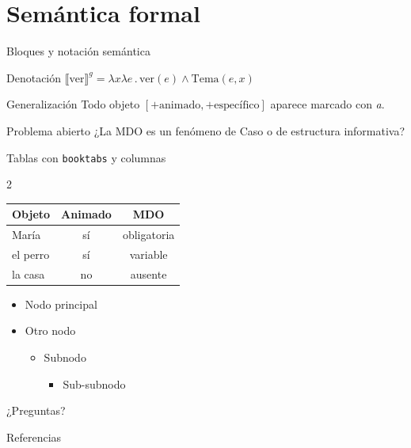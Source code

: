 \documentclass[aspectratio=169,10pt]{beamer}
\begin{document}
\section{Semántica formal}

\begin{frame}{Bloques y notación semántica}
  \begin{block}{Denotación}
    $\llbracket \text{ver} \rrbracket^{g} =
      \lambda x \lambda e\,.\,\mathrm{ver}(e) \wedge \mathrm{Tema}(e, x)$
  \end{block}
  \begin{exampleblock}{Generalización}
    Todo objeto \([+\text{animado}, +\text{específico}]\) aparece marcado con \emph{a}.
  \end{exampleblock}
  \begin{alertblock}{Problema abierto}
    ¿La MDO es un fenómeno de Caso o de estructura informativa?
  \end{alertblock}
\end{frame}

\begin{frame}{Tablas con \texttt{booktabs} y columnas}
  \begin{multicols}{2}
    \begin{table}
      \centering
      \begin{tabular}{lcc}
        \toprule
        Objeto & Animado & MDO \\
        \midrule
        María        & sí & obligatoria \\
        el perro     & sí & variable \\
        la casa      & no & ausente \\
        \bottomrule
      \end{tabular}
    \end{table}
    \columnbreak
    \begin{itemize}
      \item Nodo principal
      \item Otro nodo
        \begin{itemize}
          \item Subnodo
            \begin{itemize}
              \item Sub-subnodo
            \end{itemize}
        \end{itemize}
    \end{itemize}
  \end{multicols}
\end{frame}

\begin{frame}
  ¿Preguntas?
\end{frame}

\appendix
\nocite{*}
\begin{frame}[allowframebreaks]{Referencias}
  \printbibliography[heading=none]
\end{frame}
\end{document}

